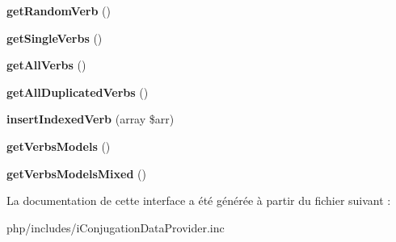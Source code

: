 \begin{DoxyCompactItemize}
{\bfseries get\+Random\+Verb} ()
\item 
\hypertarget{interfaceIConjugationDataProvider_ac409d7c67841ef17b3aecaf330b9e675}{}\label{interfaceIConjugationDataProvider_ac409d7c67841ef17b3aecaf330b9e675} 
{\bfseries get\+Single\+Verbs} ()
\item 
\hypertarget{interfaceIConjugationDataProvider_acd3b7b4f960ad952b0c4e929d02c8923}{}\label{interfaceIConjugationDataProvider_acd3b7b4f960ad952b0c4e929d02c8923} 
{\bfseries get\+All\+Verbs} ()
\item 
\hypertarget{interfaceIConjugationDataProvider_a4526378019b6276cb91e64bddd3b1d77}{}\label{interfaceIConjugationDataProvider_a4526378019b6276cb91e64bddd3b1d77} 
{\bfseries get\+All\+Duplicated\+Verbs} ()
\item 
\hypertarget{interfaceIConjugationDataProvider_ac37a4f6f2def34dea3f008dce50bf41d}{}\label{interfaceIConjugationDataProvider_ac37a4f6f2def34dea3f008dce50bf41d} 
{\bfseries insert\+Indexed\+Verb} (array \$arr)
\item 
\hypertarget{interfaceIConjugationDataProvider_a1de2fd05896540e0e4e1f50631a2e86b}{}\label{interfaceIConjugationDataProvider_a1de2fd05896540e0e4e1f50631a2e86b} 
{\bfseries get\+Verbs\+Models} ()
\item 
\hypertarget{interfaceIConjugationDataProvider_aa30e7166c6d8e812482d6e420e05cc6c}{}\label{interfaceIConjugationDataProvider_aa30e7166c6d8e812482d6e420e05cc6c} 
{\bfseries get\+Verbs\+Models\+Mixed} ()
\end{DoxyCompactItemize}


La documentation de cette interface a été générée à partir du fichier suivant \+:\begin{DoxyCompactItemize}
\item 
php/includes/i\+Conjugation\+Data\+Provider.\+inc\end{DoxyCompactItemize}
